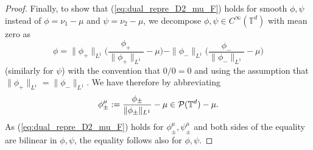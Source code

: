 \begin{proof}
Finally, to show that (\ref{eq:dual_repre_D2_mu_F}) holds for smooth $\phi,\psi$ instead of $\phi=\nu_1 - \mu$ and $\psi = \nu_2 - \mu$, we decompose $\phi, \psi \in C^{\infty}(\mathbb{T}^d)$ with mean zero as 
\[
\phi = \|\phi_+\|_{L^1}\Big(\frac{\phi_+}{\|\phi_+\|_{L^1}} - \mu\Big)  - \|\phi_-\|_{L^1}\Big(\frac{\phi_-}{\|\phi_-\|_{L^1}}- \mu\Big)
\]
(similarly for $\psi$) with the convention that $0/0 = 0$ and using the assumption that $\|\phi_+\|_{L^1} = \|\phi_-\|_{L^1}$. We have therefore by abbreviating 
\[
\phi^{\mu}_{\pm} := \frac{\phi_{\pm}}{\|\phi_{\pm}\|_{L^1}} - \mu \in \mathcal{P}(\mathbb{T}^d) - \mu.
\]
As (\ref{eq:dual_repre_D2_mu_F}) holds for $\phi^{\mu}_{\pm}, \psi^{\mu}_{\pm}$ and both sides of the equality are bilinear in $\phi, \psi$, the equality follows also for $\phi,\psi$.

\end{proof}
